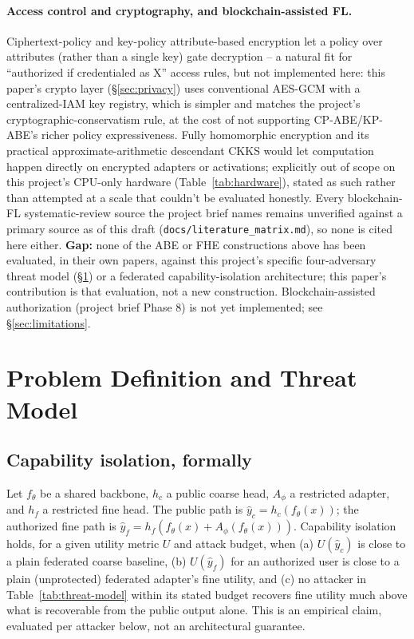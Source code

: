 \documentclass[11pt]{article}
\begin{document}
\paragraph{Access control and cryptography, and blockchain-assisted FL.}
Ciphertext-policy \citep{bethencourt2007ciphertext} and key-policy
\citep{goyal2006attribute} attribute-based encryption let a policy over
attributes (rather than a single key) gate decryption -- a natural fit for
``authorized if credentialed as X'' access rules, but not implemented here:
this paper's crypto layer (\S\ref{sec:privacy}) uses conventional AES-GCM
with a centralized-IAM key registry, which is simpler and matches the
project's cryptographic-conservatism rule, at the cost of not supporting
CP-ABE/KP-ABE's richer policy expressiveness. Fully homomorphic encryption
\citep{gentry2009fully} and its practical approximate-arithmetic
descendant CKKS \citep{cheon2017homomorphic} would let computation happen
directly on encrypted adapters or activations; explicitly out of scope on
this project's CPU-only hardware (Table~\ref{tab:hardware}), stated as such
rather than attempted at a scale that couldn't be evaluated honestly.
Every blockchain-FL systematic-review source the project brief names
remains unverified against a primary source as of this draft
(\texttt{docs/literature\_matrix.md}), so none is cited here either.
\textbf{Gap:} none of the ABE or FHE
constructions above has been evaluated, in their own papers, against this
project's specific four-adversary threat model (\S\ref{sec:threat}) or a
federated capability-isolation architecture; this paper's contribution is
that evaluation, not a new construction. Blockchain-assisted authorization
(project brief Phase 8) is not yet implemented; see
\S\ref{sec:limitations}.

\section{Problem Definition and Threat Model}
\label{sec:threat}

\subsection{Capability isolation, formally}
Let $f_\theta$ be a shared backbone, $h_c$ a public coarse head, $A_\phi$ a
restricted adapter, and $h_f$ a restricted fine head. The public path is
$\hat y_c = h_c(f_\theta(x))$; the authorized fine path is
$\hat y_f = h_f(f_\theta(x) + A_\phi(f_\theta(x)))$. Capability isolation
holds, for a given utility metric $U$ and attack budget, when (a)
$U(\hat y_c)$ is close to a plain federated coarse baseline, (b)
$U(\hat y_f)$ for an authorized user is close to a plain (unprotected)
federated adapter's fine utility, and (c) no attacker in
Table~\ref{tab:threat-model} within its stated budget recovers fine utility
much above what is recoverable from the public output alone. This is an
empirical claim, evaluated per attacker below, not an architectural
guarantee.
\end{document}
